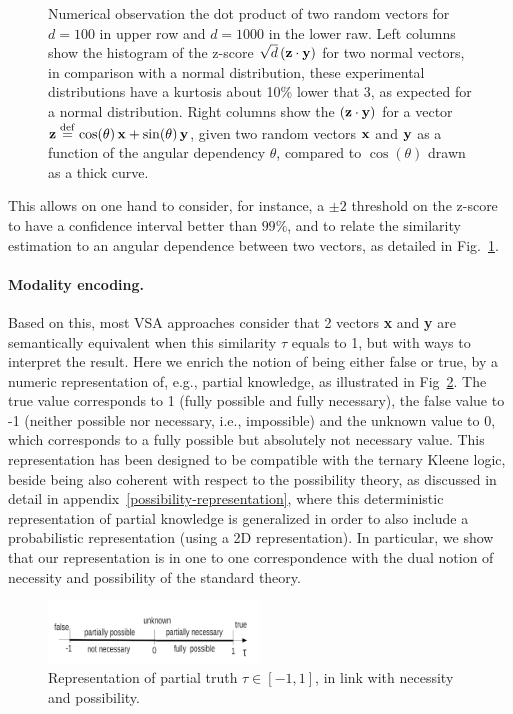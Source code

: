 \documentclass[a4]{article}
\newcommand{\deq}{\stackrel {\rm def}{=}}
\begin{document}
\begin{figure}[htbp]
{\begin{tabular}{cc}
\end{tabular}}
\caption{Numerical observation the dot product of two random vectors for $d=100$ in upper row and $d=1000$ in the lower raw. Left columns show the histogram of the z-score $\sqrt{d} \, ({\bf z} \cdot {\bf y})$ for two normal vectors, in comparison with a normal distribution, these experimental distributions have a kurtosis about 10\% lower that 3, as expected for a normal distribution. Right columns show the $({\bf z} \cdot {\bf y})$ for a vector ${\bf z} \deq \cos(\theta) \, {\bf x} + \sin(\theta) \, {\bf y}$, given two random vectors ${\bf x}$ and ${\bf y}$ as a function of the angular dependency $\theta$, compared to $\cos(\theta)$ drawn as a thick curve.}
\label{z_score}
\end{figure}

This allows on one hand to consider, for instance, a $\pm 2$ threshold on the z-score to have a confidence interval better than $99\%$, and to relate the similarity estimation to an angular dependence between two vectors, as detailed in Fig.~\ref{z_score}.

\paragraph{Modality encoding.}

Based on this, most VSA approaches consider that 2 vectors \textbf{x} and \textbf{y} are semantically equivalent when this similarity $\tau$ equals to 1, but with ways to interpret the result. Here we enrich the notion of being either false or true, by a numeric representation of, e.g., partial knowledge, as illustrated in Fig~\ref{possibility-necessity}. The true value corresponds to 1 (fully possible and fully necessary), the false value to -1 (neither possible nor necessary, i.e., impossible) and the unknown value to 0, which corresponds to a fully possible but absolutely not necessary value. This representation has been designed to be compatible with the ternary Kleene logic, beside being also coherent with respect to the possibility theory, as discussed in detail in appendix~\ref{possibility-representation}, where this deterministic representation of partial knowledge is generalized in order to also include a probabilistic representation (using a 2D representation). In particular, we show that our representation is in one to one correspondence with the dual notion of necessity and possibility of the standard theory.

\begin{figure}[htbp]
\centerline{\includegraphics[width=0.5\textwidth]{figures/possibility-necessity.png}}
\caption{Representation of partial truth $\tau \in [-1,1]$, in link with necessity and possibility.}
\label{possibility-necessity}
\end{figure}
\end{document}
